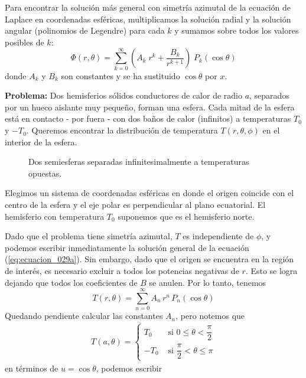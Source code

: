 Para encontrar la solución más general con simetría azimutal de la ecuación de Laplace en coordenadas esféricas, multiplicamos la solución radial y la solución angular (polinomios de Legendre) para cada $k$ y sumamos sobre todos los valores posibles de $k$:
\begin{equation}
\Phi (r, \theta) = \sum_{k=0}^{\infty} \left( A_{k} \; r^{k} + \dfrac{B_{k}}{r^{k+1}} \right) \; P_{k} (\cos \theta)
\label{eq:ecuacion_029a}
\end{equation}
donde $A_{k}$ y $B_{k}$ son constantes y se ha sustituido $\cos \theta$ por $x$.
\par
\textbf{Problema: } Dos hemisferios sólidos conductores de calor de radio $a$, separados por un hueco aislante muy pequeño, forman una esfera. Cada mitad de la esfera está en contacto - por fuera - con dos baños de calor (infinitos) a temperaturas $T_{0}$ y $-T_{0}$. Queremos encontrar la distribución de temperatura $T (r, \theta, \phi)$ en el interior de la esfera.
\begin{figure}[H]
\centering

\caption{Dos semiesferas separadas infinitesimalmente a temperaturas opuestas.}
\label{fig:figura2}
\end{figure}
Elegimos un sistema de coordenadas esféricas en donde el origen coincide con el centro de la esfera y el eje polar es perpendicular al plano ecuatorial. El hemisferio con temperatura $T_{0}$ suponemos que es el hemisferio norte.
\par
Dado que el problema tiene simetría azimutal, $T$ es independiente de $\phi$, y podemos escribir inmediatamente la solución general de la ecuación (\ref{eq:ecuacion_029a}). Sin embargo, dado que el origen se encuentra en la región de interés, es necesario excluir a todos los potencias negativas de $r$. Esto se logra dejando que todos los coeficientes de $B$ se anulen. Por lo tanto, tenemos
\begin{equation}
T(r, \theta) = \sum_{n=0}^{\infty} A_{n} \, r^{n} \, P_{n} (\cos \theta)
\label{eq:ecuacion_050a}
\end{equation}
Quedando pendiente calcular las constantes $A_{n}$, pero notemos que
\begin{align*}
T(a, \theta) = 
\begin{cases}
T_{0} & \text{ si } 0 \leq \theta < \dfrac{\pi}{2} \\
-T_{0} & \text{ si } \dfrac{\pi}{2} < \theta \leq \pi 
\end{cases}
\end{align*}
en términos de $u= \cos \theta$, podemos escribir
